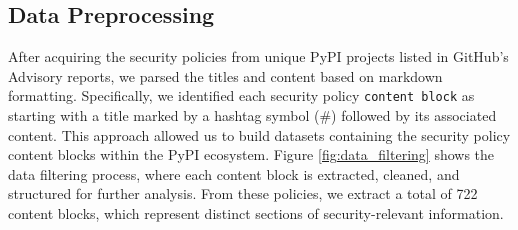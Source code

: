 \subsection{Data Preprocessing} 


After acquiring the security policies from unique PyPI projects listed in GitHub's Advisory reports, we parsed the titles and content based on markdown formatting. Specifically, we identified each security policy \texttt{content block} as starting with a title marked by a hashtag symbol (\#) followed by its associated content. This approach allowed us to build datasets containing the security policy content blocks within the PyPI ecosystem. Figure \ref{fig:data_filtering} shows the data filtering process, where each content block is extracted, cleaned, and structured for further analysis. From these policies, we extract a total of 722 content blocks, which represent distinct sections of security-relevant information. 



